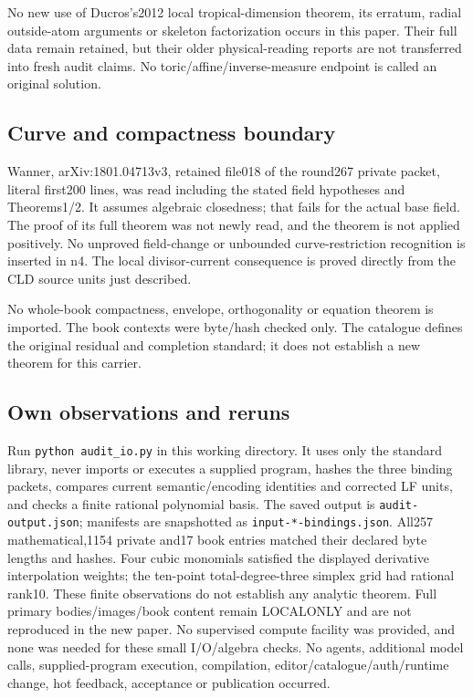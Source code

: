\documentclass[11pt]{article}
\begin{document}
No new use of Ducros's2012 local tropical-dimension theorem, its erratum, radial outside-atom arguments or skeleton factorization occurs in this paper. Their full data remain retained, but their older physical-reading reports are not transferred into fresh audit claims. No toric/affine/inverse-measure endpoint is called an original solution.

\subsection*{Curve and compactness boundary}

Wanner, arXiv:1801.04713v3, retained file018 of the round267 private packet, literal first200 lines, was read including the stated field hypotheses and Theorems1/2. It assumes algebraic closedness; that fails for the actual base field. The proof of its full theorem was not newly read, and the theorem is not applied positively. No unproved field-change or unbounded curve-restriction recognition is inserted in n4. The local divisor-current consequence is proved directly from the CLD source units just described.

No whole-book compactness, envelope, orthogonality or equation theorem is imported. The book contexts were byte/hash checked only. The catalogue defines the original residual and completion standard; it does not establish a new theorem for this carrier.

\subsection*{Own observations and reruns}

Run \texttt{python audit\_io.py} in this working directory. It uses only the standard library, never imports or executes a supplied program, hashes the three binding packets, compares current semantic/encoding identities and corrected LF units, and checks a finite rational polynomial basis. The saved output is \texttt{audit-output.json}; manifests are snapshotted as \texttt{input-*-bindings.json}. All257 mathematical,1154 private and17 book entries matched their declared byte lengths and hashes. Four cubic monomials satisfied the displayed derivative interpolation weights; the ten-point total-degree-three simplex grid had rational rank10. These finite observations do not establish any analytic theorem. Full primary bodies/images/book content remain LOCALONLY and are not reproduced in the new paper. No supervised compute facility was provided, and none was needed for these small I/O/algebra checks. No agents, additional model calls, supplied-program execution, compilation, editor/catalogue/auth/runtime change, hot feedback, acceptance or publication occurred.
\end{document}
